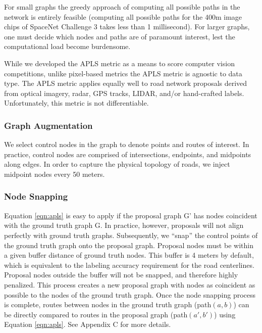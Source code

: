 \documentclass{article}
\begin{document}
For small graphs the greedy approach of computing all possible paths in the network is entirely feasible 
(computing all possible paths for the 400m image chips of SpaceNet Challenge 3 takes less than 1 millisecond). 
For larger graphs, one must decide which nodes and paths are of paramount interest, lest the computational load become burdensome. 


While we developed the APLS metric as a means to score computer vision competitions, unlike pixel-based metrics the APLS metric is agnostic to data type.  The APLS metric applies equally well to road network proposals derived from optical imagery, radar, GPS tracks, LIDAR, and/or hand-crafted labels.  Unfortunately, this metric is not differentiable.

\subsubsection{Graph Augmentation}

We select control nodes in the graph to denote points and routes of interest.
In practice, control nodes are comprised of intersections, endpoints, and midpoints along edges.  In order to capture the physical topology of roads, we inject midpoint nodes every 50 meters.  


\subsubsection{Node Snapping}\label{sec:node_snap}

Equation \ref{eqn:apls} is easy to apply if the proposal graph G' has nodes coincident with the ground truth graph G. In practice, however, proposals will not align perfectly with ground truth graphs. Subsequently, we ``snap'' the control points of the ground truth graph onto the proposal graph. Proposal nodes must be within a given buffer distance of ground truth nodes.  This buffer is 4 meters by default, which is equivalent to the labeling accuracy requirement for the road centerlines.  Proposal nodes outside the buffer will not be snapped, and therefore highly penalized.  This process creates a new proposal graph with nodes as coincident as possible to the nodes of the ground truth graph.  Once the node snapping process is complete, routes between nodes in the ground truth graph (path$(a,b)$) can be directly compared to routes in the proposal graph (path$(a',b')$) using Equation \ref{eqn:apls}.
See Appendix C for more details.
\end{document}
